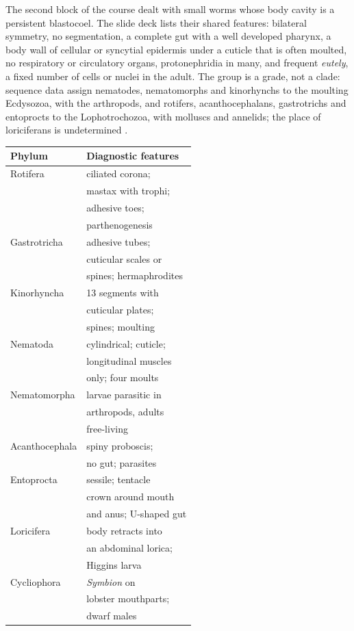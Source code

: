 The second block of the course dealt with
small worms whose body cavity is a persistent
blastocoel. The slide deck lists their shared
features: bilateral symmetry, no
segmentation, a complete gut with a well
developed pharynx, a body wall of cellular or
syncytial epidermis under a cuticle that is
often moulted, no respiratory or circulatory
organs, protonephridia in many, and frequent
\emph{eutely}, a fixed number of cells or
nuclei in the adult. The group is a grade,
not a clade: sequence data assign nematodes,
nematomorphs and kinorhynchs to the moulting
Ecdysozoa, with the arthropods, and rotifers,
acanthocephalans, gastrotrichs and entoprocts
to the Lophotrochozoa, with molluscs and
annelids; the place of loriciferans is
undetermined \cite[Chapter
9]{hickman2002animal}.

\begin{center}
\begin{tabular}{ll}
Phylum & Diagnostic features \\
\hline
Rotifera & ciliated corona; \\
& mastax with trophi; \\
& adhesive toes; \\
& parthenogenesis \\
Gastrotricha & adhesive tubes; \\
& cuticular scales or \\
& spines; hermaphrodites \\
Kinorhyncha & 13 segments with \\
& cuticular plates; \\
& spines; moulting \\
Nematoda & cylindrical; cuticle; \\
& longitudinal muscles \\
& only; four moults \\
Nematomorpha & larvae parasitic in \\
& arthropods, adults \\
& free-living \\
Acanthocephala & spiny proboscis; \\
& no gut; parasites \\
Entoprocta & sessile; tentacle \\
& crown around mouth \\
& and anus; U-shaped gut \\
Loricifera & body retracts into \\
& an abdominal lorica; \\
& Higgins larva \\
Cycliophora & \emph{Symbion} on \\
& lobster mouthparts; \\
& dwarf males \\
\end{tabular}
\end{center}

